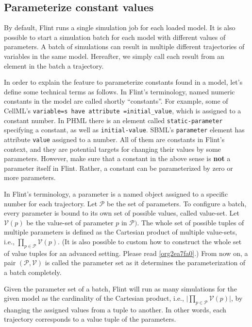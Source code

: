 \documentclass[a4paper,10pt]{report}
\begin{document}
\subsection{Parameterize constant values}
\label{sec:org3d50f87}
By default, Flint runs a single simulation job for each loaded model.
It is also possible to start a simulation batch for each model with
different values of parameters.
A batch of simulations can result in multiple different trajectories of
variables in the same model. Hereafter, we simply call each result from
an element in the batch a trajectory.

In order to explain the feature to parameterize constants found in a model,
let's define some technical terms as follows.
In Flint's terminology, named numeric constants in the model are called
shortly ``constants''.
For example, some of CellML's \texttt{variable=s have attribute
=initial\_value}, which is assigned to a constant number.
In PHML there is an element called \texttt{static-parameter} specifying a constant,
as well as \texttt{initial-value}.
SBML's \texttt{parameter} element has attribute \texttt{value} assigned to a number.
All of them are constants in Flint's context, and they are potential targets for
changing their values by some parameters.
However, make sure that a constant in the above sense is \textbf{not} a parameter
itself in Flint.
Rather, a constant can be parameterized by zero or more parameters.

In Flint's terminology, a parameter is a named object assigned to a specific
number for each trajectory.
Let \(\mathcal{P}\) be the set of parameters.
To configure a batch, every parameter is bound to its own set of possible
values, called value-set.
Let \(\mathcal{V}(p)\) be the value-set of parameter \(p\) in \(\mathcal{P})\).
The whole set of possible tuples of multiple parameters is defined as the
Cartesian product of multiple value-sets, i.e., \(\prod_{p \in \mathcal{P}}
\mathcal{V}(p)\).
(It is also possible to custom how to construct the whole set of value tuples
for an advanced setting. Please read \ref{org2ea7fa0}.)
From now on, a pair \((\mathcal{P}, \mathcal{V})\) is called the parameter set as
it determines the parameterization of a batch completely.

Given the parameter set of a batch, Flint will run as many simulations for the
given model as the cardinality of the Cartesian product, i.e.,
\(\lvert \prod_{p \in \mathcal{P}} \mathcal{V}(p) \rvert\), by changing the
assigned values from a tuple to another.
In other words, each trajectory corresponds to a value tuple of the parameters.
\end{document}
